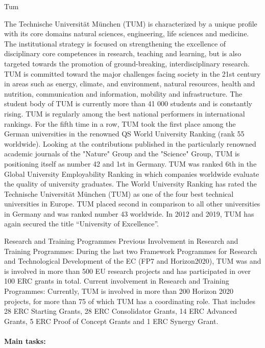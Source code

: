 \begin{sitedescription}{Tum}


The 
Technische Universität München
(TUM) is characterized by a unique profile with its core domains natural sciences, engineering, life sciences and medicine. The institutional strategy is focused on strengthening the excellence of disciplinary core competences in research, teaching and learning, but is also targeted towards the promotion of ground-breaking, interdisciplinary research. TUM is committed toward the major challenges facing society in the 21st century in areas such as energy, climate, and environment, natural resources, health and nutrition, communication and information, mobility and infrastructure.
The student body of TUM is currently more than 41 000 students and is constantly rising. TUM is regularly among the best national performers in international rankings. For the fifth time in a row, TUM took the first place among the German universities in the renowned QS World University Ranking (rank 55 worldwide). Looking at the contributions published in the particularly renowned academic journals of the "Nature" Group and the "Science" Group, TUM is positioning itself as number 42 and 1st in Germany. TUM was ranked 6th in the Global University Employability Ranking in which companies worldwide evaluate the quality of university graduates. The World University Ranking has rated the
Technische Universität München
(TUM) as one of the four best technical universities in Europe. TUM placed second in comparison to all other universities in Germany and was ranked number 43 worldwide. 
In 2012 and 2019, TUM has again secured the title ``University of Excellence''.

Research and Training Programmes
Previous Involvement in Research and Training Programmes:
During the last two Framework Programmes for Research and Technological Development of the EC (FP7 and Horizon2020), TUM was and is involved in more than 500 EU research projects and has participated in over 100 ERC grants in total.
Current involvement in Research and Training Programmes: 
Currently, TUM is involved in more than 200 Horizon 2020 projects, for more than 75 of which TUM has a coordinating role. That includes 28 ERC Starting Grants, 28 ERC Consolidator Grants, 14 ERC Advanced Grants, 5 ERC Proof of Concept Grants and 1 ERC Synergy Grant.

\paragraph*{Main tasks:}


\end{sitedescription}
